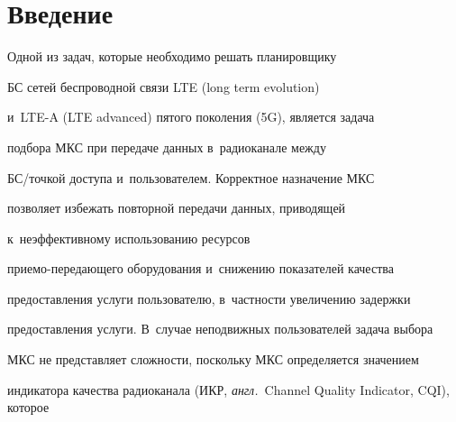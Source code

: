   




  


  












 \thispagestyle{headings}


 


 \vspace*{-14pt}


 


  \section{Введение}


  


\vspace*{-2pt}


  


  Одной из задач, которые необходимо решать планировщику 


БС сетей беспроводной связи LTE (long term evolution)


и~LTE-A (LTE advanced) пятого поколения (5G), является задача 


подбора МКС при передаче данных в~радиоканале между 


БС/точ\-кой доступа и~пользователем. Корректное назначение МКС 


позволяет избежать повторной передачи данных, приводящей 


к~неэффективному использованию ресурсов  


при\-емо-пе\-ре\-да\-юще\-го оборудования и~снижению показателей качества 


предостав\-ле\-ния услуги пользователю, в~част\-ности увеличению задержки 


предостав\-ле\-ния услуги. В~случае неподвижных пользователей задача выбора 


МКС не представляет слож\-ности, поскольку МКС определяется значением 


индикатора качества радиоканала (ИКР, \textit{англ.}\ Channel Quality Indicator, CQI), которое 


